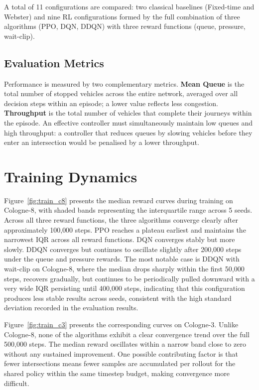 A total of 11 configurations are compared: two classical baselines (Fixed-time
and Webster) and nine RL configurations formed by the full combination of three
algorithms (PPO, DQN, DDQN) with three reward functions (queue, pressure,
wait-clip).

\subsection{Evaluation Metrics}

Performance is measured by two complementary metrics. \textbf{Mean Queue} is
the total number of stopped vehicles across the entire network, averaged over
all decision steps within an episode; a lower value reflects less congestion.
\textbf{Throughput} is the total number of vehicles that complete their
journeys within the episode. An effective controller must simultaneously
maintain low queues and high throughput: a controller that reduces queues by
slowing vehicles before they enter an intersection would be penalised by a
lower throughput.

\section{Training Dynamics}
\label{sec:training}

Figure~\ref{fig:train_c8} presents the median reward curves during training on
Cologne-8, with shaded bands representing the interquartile range across
5 seeds. Across all three reward functions, the three algorithms converge
clearly after approximately 100{,}000 steps. PPO reaches a plateau earliest
and maintains the narrowest IQR across all reward functions. DQN converges
stably but more slowly. DDQN converges but continues to oscillate slightly
after 200{,}000 steps under the queue and pressure rewards. The most notable
case is DDQN with wait-clip on Cologne-8, where the median drops sharply
within the first 50{,}000 steps, recovers gradually, but continues to be
periodically pulled downward with a very wide IQR persisting until 400{,}000
steps, indicating that this configuration produces less stable results across
seeds, consistent with the high standard deviation recorded in the evaluation
results.

Figure~\ref{fig:train_c3} presents the corresponding curves on Cologne-3.
Unlike Cologne-8, none of the algorithms exhibit a clear convergence trend
over the full 500{,}000 steps. The median reward oscillates within a narrow
band close to zero without any sustained improvement. One possible contributing
factor is that fewer intersections means fewer samples are accumulated per
rollout for the shared policy within the same timestep budget, making
convergence more difficult.

